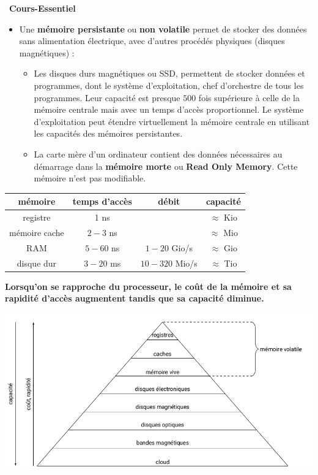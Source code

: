 \documentclass[a4paper, french, 11pt]{article}  %
\newcounter{prop}
\newcounter{cours}
\newenvironment{cours}[1]
{\par \medskip   \addtocounter{cours}{1} \noindent  
\begin{bclogo}[arrondi =0.1,  ombre = true, barre=none, logo=\bcbook, marge=4]{~\textbf{Cours-Essentiel} \textbf{\thecours} {\itshape #1} }  \par}
{
\end{bclogo}
 \par \bigskip }
\newcounter{prog}
\begin{document}
\begin{cours}{}
\begin{itemize}[label=]
   \item Une \textbf{mémoire persistante} ou \textbf{non volatile} permet de stocker des données sans alimentation électrique, avec d'autres procédés physiques (disques  magnétiques) : 
   
   \begin{itemize}
   	\item Les disques durs magnétiques ou SSD,  permettent de stocker  données et  programmes, dont le système d'exploitation, chef d'orchestre de tous les programmes. Leur capacité est presque $500$ fois supérieure à  celle de la mémoire centrale mais avec un temps d'accès proportionnel.  Le système d'exploitation peut étendre virtuellement la mémoire centrale en utilisant les capacités des mémoires persistantes.
   	\item La carte mère d'un ordinateur contient des données nécessaires au démarrage dans la \textbf{mémoire morte} ou \textbf{Read Only Memory}. Cette mémoire n'est pas modifiable.
   \end{itemize}
   
\end{itemize}

\begin{center}
\begin{tabular}{|c|c|c|c|}
\hline 
\textbf{mémoire} & \textbf{temps d'accès} & \textbf{débit} & \textbf{capacité} \\ 
\hline 
registre & 1 ns &  & $\approx$ Kio \\ 
\hline 
 mémoire cache & $2-3$ ns &  & $\approx$ Mio \\ 
\hline 
RAM & $5-60$ ns & $1-20$ Gio/s & $\approx$ Gio \\ 
\hline 
disque dur & $3-20$ ms & $10-320$ Mio/s & $\approx$ Tio \\ 
\hline 
\end{tabular} 
\end{center}


\textbf{Lorsqu'on se rapproche du processeur,  le coût de la mémoire et sa rapidité d'accès augmentent tandis que sa  capacité diminue.}


\begin{center}
\includegraphics[scale=0.5]{images/hierarchie_memoire.png}
\end{center}

\end{cours}
\end{document}
